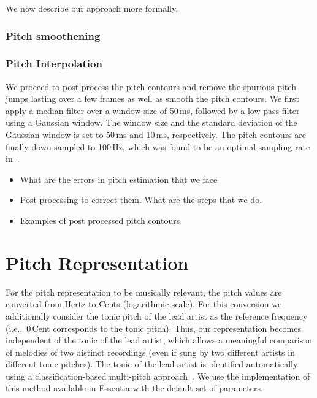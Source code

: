 {We now describe our approach more formally. 











\subsubsection{Pitch smoothening}
\label{sec:data_processing_pitch_smoothening}


\subsubsection{Pitch Interpolation}
\label{sec:data_processing_pitch_interpolation}



 

We proceed to post-process the pitch contours and remove the spurious pitch jumps lasting over a few frames as well as smooth the pitch contours. We first apply a median filter over a window size of 50\,ms, followed by a low-pass filter using a Gaussian window. The window size and the standard deviation of the Gaussian window is set to 50\,ms and 10\,ms, respectively. The pitch contours are finally down-sampled to 100\,Hz, which was found to be an optimal sampling rate in~\cite{gulati_ICASSP2015}. 

\begin{itemize}
	\item What are the errors in pitch estimation that we face
	\item Post processing to correct them. What are the steps that we do.
	\item Examples of post processed pitch contours.
\end{itemize}


\section{Pitch Representation} 

For the pitch representation to be musically relevant, the pitch values are converted from Hertz to Cents (logarithmic scale). For this conversion we additionally consider the tonic pitch of the lead artist as the reference frequency (i.e.,~0\,Cent corresponds to the tonic pitch). Thus, our representation becomes independent of the tonic of the lead artist, which allows a meaningful comparison of melodies of two distinct recordings (even if sung by two different artists in different tonic pitches). The tonic of the lead artist is identified automatically using a classification-based multi-pitch approach~\cite{Gulati2014Tonic}. We use the implementation of this method available in Essentia with the default set of parameters.%


}
